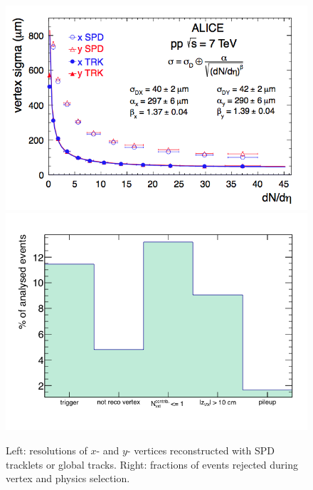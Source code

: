 \begin{figure}[!t]
\centering
\includegraphics[width=.49\textwidth]{FigCap4/VtxReso.png}
\includegraphics[width=.49\textwidth]{FigCap4/RejFracPass4.png}
\caption{Left: resolutions of $x$- and $y$- vertices reconstructed with SPD tracklets or global tracks. Right: fractions of events rejected during vertex and physics selection.}
\label{fig:vxtReso}
\end{figure}



